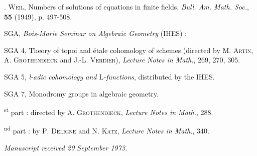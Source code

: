 \documentclass[10pt,leqno]{article}
\begin{document}
\clearpage

\label{physical-36}\par\smallskip

\noindent [\(4] \). \textsc{Weil}, Numbers of solutions of equations in finite fields, \emph{Bull. Am. Math. Soc.}, \textbf{55} (1949), p. 497-508.\par

\noindent SGA, \emph{Bois-Marie Seminar on Algebraic Geometry} (IHES) :\par

\noindent SGA 4, Theory of topoi and étale cohomology of schemes (directed by \(\mathrm{M}\). \textsc{Artin}, \(\mathrm{A}\). \textsc{Grothendieck} and J.-L. \textsc{Verdier}), \emph{Lecture Notes in Math.}, 269, 270, 305.\par

\noindent SGA 5, \emph{l-adic cohomology and \(\mathrm{L}\)-functions}, distributed by the IHES.\par

\noindent SGA 7, Monodromy groups in algebraic geometry.\par

\textsuperscript{st} part : directed by \(\mathrm{A}\). \textsc{Grothendieck}, \emph{Lecture Notes in Math.}, 288.\par

\textsuperscript{nd} part : by \(\mathrm{P}\). \textsc{Deligne} and \(\mathrm{N}\). \textsc{Katz}, \emph{Lecture Notes in Math.}, 340.\par

\begin{flushright}\emph{Manuscript received 20 September 1973.}\end{flushright}

\clearpage
\end{document}
